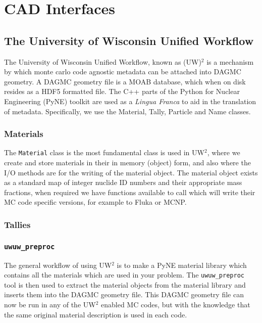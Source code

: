 \clearpage
\section{CAD Interfaces}
\label{sec:cad_interfaces}
\subsection{The University of Wisconsin Unified Workflow}
\label{sec:uwuw}
The University of Wisconsin Unified Workflow, known as (UW)$^2$ is a mechanism by which 
monte carlo code agnostic metadata can be attached into DAGMC \cite{dagmc} geometry. A DAGMC geometry
file is a MOAB \cite{moab} database, which when on disk resides as a HDF5 formatted file. The C++
parts of the Python for Nuclear Engineering (PyNE) toolkit are used as a \textit{Lingua Franca}
to aid in the translation of metadata. Specifically, we use the Material, Tally, Particle 
and Name classes.
\subsubsection*{Materials}
The \texttt{Material} class is the most fundamental class is used in UW$^2$, where we create and store
materials in their in memory (object) form, and also where the I/O methods are for the writing 
of the material object. The material object exists as a standard map of integer nuclide ID numbers
and their appropriate mass fractions, when required we have functions available to call which will
write their MC code specific versions, for example to Fluka or MCNP. 
\subsubsection*{Tallies}
\subsubsection*{\texttt{uwuw\_preproc}}
The general workflow of using UW$^2$ is to make a PyNE material library which contains all the materials
which are used in your problem. The \texttt{uwuw\_preproc} tool is then used to extract the material 
objects from the material library and inserts them into the DAGMC geometry file. This DAGMC geometry
file can now be run in any of the UW$^2$ enabled MC codes, but with the knowledge that the same original
material description is used in each code. 
